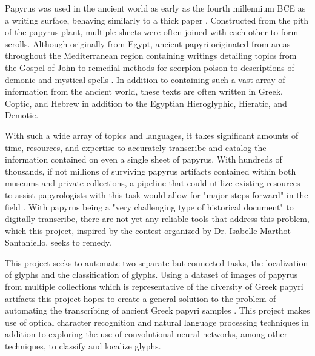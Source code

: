Papyrus was used in the ancient world as early as the fourth millennium BCE as a writing surface, behaving similarly to a thick paper \cite{Houston}. Constructed from the pith of the papyrus plant, multiple sheets were often joined with each other to form scrolls. Although originally from Egypt, ancient papyri originated from areas throughout the Mediterranean region containing writings detailing topics from the Gospel of John to remedial methods for scorpion poison to descriptions of demonic and mystical spells \cite{Comfort, Scorpion, Betz}. In addition to containing such a vast array of information from the ancient world, these texts are often written in Greek, Coptic, and Hebrew in addition to the Egyptian Hieroglyphic, Hieratic, and Demotic.

With such a wide array of topics and languages, it takes significant amounts of time, resources, and expertise to accurately transcribe and catalog the information contained on even a single sheet of papyrus. With hundreds of thousands, if not millions of surviving papyrus artifacts contained within both museums and private collections, a pipeline that could utilize existing resources to assist papyrologists with this task would allow for "major steps forward" in the field \cite{Contest}. With papyrus being a "very challenging type of historical document" to digitally transcribe, there are not yet any reliable tools that address this problem, which this project, inspired by the contest \cite{Contest} organized by Dr. Isabelle Marthot-Santaniello, seeks to remedy.

This project seeks to automate two separate-but-connected tasks, the localization of glyphs and the classification of glyphs. Using a dataset of images of papyrus from multiple collections which is representative of the diversity of Greek papyri artifacts this project hopes to create a general solution to the problem of automating the transcribing of ancient Greek papyri samples \cite{Contest}. This project makes use of optical character recognition and natural language processing techniques in addition to exploring the use of convolutional neural networks, among other techniques, to classify and localize glyphs.
